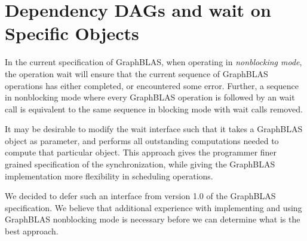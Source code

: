 \section{Dependency DAGs and {\sf wait} on Specific Objects}
\label{Sec:DAG}

In the current specification of GraphBLAS, when operating in \emph{nonblocking
mode}, the operation {\sf wait} will ensure that the current sequence of
GraphBLAS operations has either completed, or encountered some
error. Further, a sequence in nonblocking mode where every GraphBLAS
operation is followed by an {\sf wait} call is equivalent to the same
sequence in blocking mode with {\sf wait} calls removed.

It may be desirable to modify the {\sf wait} interface such that it
takes a GraphBLAS object as parameter, and performs all
outstanding computations needed to compute that particular object.
This approach gives the programmer finer grained specification of the synchronization,
while giving the GraphBLAS implementation more flexibility in scheduling operations.

We decided to defer such an interface from version 1.0 of the GraphBLAS
specification. We believe that additional experience with implementing and
using GraphBLAS nonblocking mode is necessary before we
can determine what is the best approach.
